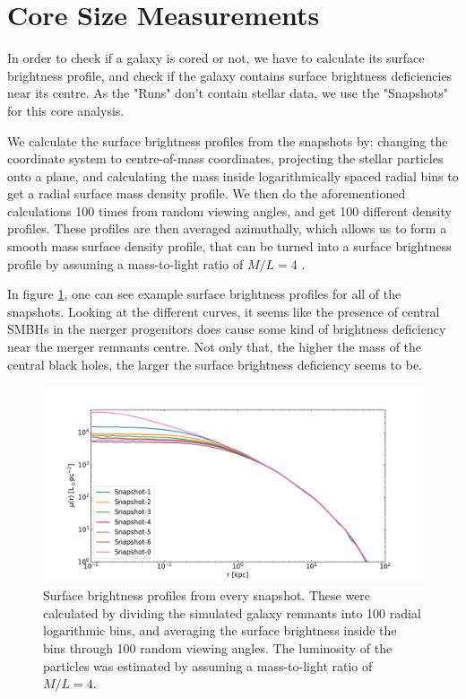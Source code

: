 \documentclass[english, oneside]{HYgradu}
\begin{document}
\section{Core Size Measurements}

In order to check if a galaxy is cored or not, we have to calculate its surface brightness profile, and check if the galaxy contains surface brightness deficiencies near its centre. As the "Runs" don't contain stellar data, we use the "Snapshots" for this core analysis. 

We calculate the surface brightness profiles from the snapshots by: changing the coordinate system to centre-of-mass coordinates, projecting the stellar particles onto a plane, and calculating the mass inside logarithmically spaced radial bins to get a radial surface mass density profile. We then do the aforementioned calculations 100 times from random viewing angles, and get 100 different density profiles. These profiles are then averaged azimuthally, which allows us to form a smooth mass surface density profile, that can be turned into a surface brightness profile by assuming a mass-to-light ratio of $M/L = 4$ \citep{Rantala2018}.

In figure \ref{figure:surface_brightness}, one can see example surface brightness profiles for all of the snapshots. Looking at the different curves, it seems like the presence of central SMBHs in the merger progenitors does cause some kind of brightness deficiency near the merger remnants centre. Not only that, the higher the mass of the central black holes, the larger the surface brightness deficiency seems to be.

\begin{figure}[h]
	\centering
	\includegraphics[width=\textwidth]{SurfaceBrightnessProfiles.png}
	\caption{Surface brightness profiles from every snapshot. These were calculated by dividing the simulated galaxy remnants into 100 radial logarithmic bins, and averaging the surface brightness inside the bins through 100 random viewing angles. The luminosity of the particles was estimated by assuming a mass-to-light ratio of $M/L = 4$.}
	\label{figure:surface_brightness}
\end{figure}
\end{document}

